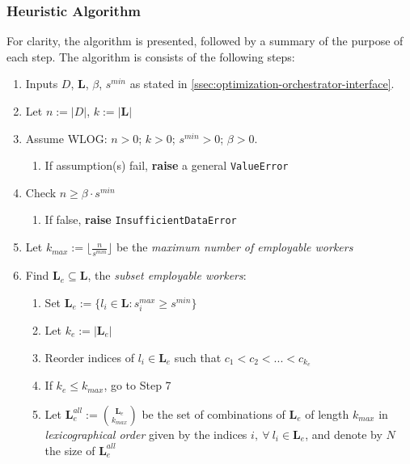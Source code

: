 \documentclass[../mthe-493-final-project.tex]{subfiles}
\begin{document}
    \subsubsection{Heuristic Algorithm}
    \label{sssec:optimization-heuristic-algorithm}
    
    For clarity, the algorithm is presented, followed by a summary of the purpose of each step. The algorithm is consists of the following steps:
    
    \begin{enumerate}
        \item Inputs $D$, $\mathbf{L}$, $\beta$, $s^{min}$ as stated in \autoref{ssec:optimization-orchestrator-interface}.
        \item Let $n := \vert D \vert$, $k := \vert \mathbf{L} \vert$
        \item Assume WLOG: $n > 0$; $k > 0$; $s^{min} > 0$; $\beta > 0$. 
            \begin{enumerate}
                \item If assumption(s) fail, \textbf{raise} a general \texttt{ValueError}
            \end{enumerate}
        \item Check $n \geq \beta \cdot s^{min}$
            \begin{enumerate}
                \item If false, \textbf{raise} \texttt{InsufficientDataError}
            \end{enumerate}
        \item Let $k_{max} := \lfloor \frac{n}{s^{min}} \rfloor$ be the \textit{maximum number of employable workers}
        \item Find $\mathbf{L}_e \subseteq \mathbf{L}$, the \textit{subset employable workers}:
            \begin{enumerate}
                \item Set $\mathbf{L}_e := \{ l_i \in \mathbf{L} : s^{max}_i \geq s^{min} \}$
                \item Let $k_e := \vert \mathbf{L}_e \vert$
                \item Reorder indices of $l_i \in \mathbf{L}_e$ such that $c_1 < c_2 < ... < c_{k_e}$
                \item If $k_e \leq k_{max}$, go to Step 7
                \item Let $\mathbf{L}_e^{all} := {\mathbf{L}_e \choose k_{max}}$ be the set of combinations of $\mathbf{L}_e$ of length $k_{max}$ in \textit{lexicographical order} given by the indices $i, \ \forall \ l_i \in \mathbf{L}_e$, and denote by $N$ the size of $\mathbf{L}_e^{all}$

\end{enumerate}
\end{enumerate}
\end{document}
